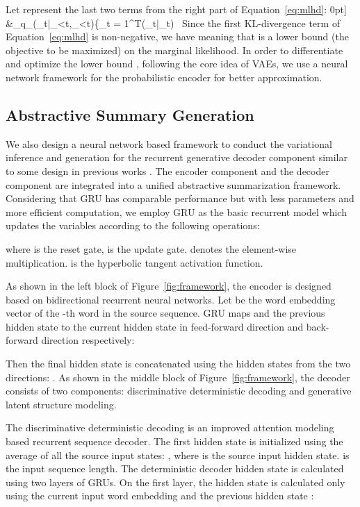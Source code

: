 \documentclass[11pt,letterpaper]{article}
\begin{document}
Let  represent the last two terms from the right part of Equation~\ref{eq:mlhd}:
0pt] &{_{q_\phi(_t|_{<t},_{<t})}}\big\{\sum\nolimits_{t = 1}^T(_{t}|_{t}) \
Since the first KL-divergence term of Equation~\ref{eq:mlhd} is non-negative, we have  meaning that  is a lower bound (the objective to be maximized) on the marginal likelihood. In order to differentiate and optimize the lower bound , following the core idea of VAEs, we use a neural network framework for the probabilistic encoder  for better approximation.


\subsection{Abstractive Summary Generation}
\label{sec:summ_gen}

We also design a neural network based framework to conduct the variational inference and generation for the recurrent generative decoder component similar to some design in previous works \cite{kingma2013auto,rezende2014stochastic,gregor2015draw}.
The encoder component and the decoder component are integrated into a unified abstractive summarization framework.
Considering that GRU has comparable performance but with less parameters and more efficient computation, we employ GRU as the basic recurrent model which updates the variables according to the following operations:

where  is the reset gate,  is the update gate.
 denotes the element-wise multiplication.  is the  hyperbolic tangent activation function.

As shown in the left block of Figure~\ref{fig:framework}, the encoder is designed based on bidirectional recurrent neural networks.
Let  be the word embedding vector of the -th word in the source sequence.
GRU maps  and the previous hidden state  to the current hidden state  in feed-forward direction and back-forward direction respectively:

Then the final hidden state  is concatenated using the hidden states from the two directions:
\scriptscriptstyle\rightharpoonup\scriptscriptstyle\leftharpoonup. 
As shown in the middle block of Figure~\ref{fig:framework}, the decoder consists of two components: discriminative deterministic decoding  and generative latent structure modeling.

The discriminative deterministic decoding is an improved attention modeling based recurrent sequence decoder. The first hidden state  is initialized using the average of all the source input states: ,
where  is the source input hidden state.  is the input sequence length.
The deterministic decoder hidden state  is calculated using two layers of GRUs.
On the first layer, the hidden state is calculated only using the current input word embedding  and the  previous hidden state :
\end{document}
